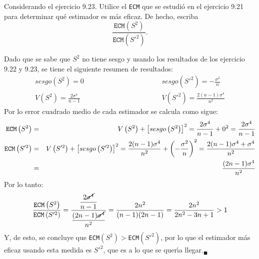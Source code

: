 \begin{enunciado}
 Considerando el ejercicio 9.23. Utilice el \texttt{ECM} que se estudi\'o en el ejercicio 9.21 para determinar qu\'e estimador es m\'as eficaz. De hecho, escriba
 \begin{equation*}
  \frac{\texttt{ECM}\left( S^2 \right)}{\texttt{ECM}\left( S'^2 \right)}.
 \end{equation*}
\end{enunciado}

\begin{solucion}
 Dado que se sabe que $S^2$ no tiene sesgo y usando los resultados de los ejercicio 9.22 y 9.23, se tiene el siguiente resumen de resultados:
 \begin{eqnarray*}
  sesgo\left( S^2 \right) = 0 & \hspace{4cm} & sesgo\left( S'^2 \right) = -\frac{\sigma^2}{n} \\
  V\left( S^2 \right) = \frac{2\sigma^4}{n-1} & & V\left( S'^2 \right) = \frac{2(n-1)\sigma^4}{n^2}
 \end{eqnarray*}
 Por lo error cuadrado medio de cada estimador se calcula como sigue:
 \begin{eqnarray*}
  \text{\texttt{ECM}}\left( S^2 \right) & = & V\left( S^2 \right) + \left[ sesgo\left( S^2 \right) \right]^2 = \frac{2\sigma^4}{n-1} + 0^2 = \frac{2\sigma^4}{n-1} \\
  \text{\texttt{ECM}}\left( S'^2 \right) & = & V\left( S'^2 \right) + \left[ sesgo\left( S'^2 \right) \right]^2 = \frac{2(n-1)\sigma^4}{n^2} + \left( -\frac{\sigma^2}{n} \right)^2 = \frac{2(n-1)\sigma^4 + \sigma^4}{n^2} \\
  & = & \frac{(2n-1)\sigma^4}{n^2}
 \end{eqnarray*}
 Por lo tanto:
 \begin{equation*}
  \frac{\texttt{ECM}\left( S^2 \right)}{\texttt{ECM}\left( S'^2 \right)} = \frac{\displaystyle{\frac{2\cancel{\sigma^4}}{n-1}}}{\displaystyle{\frac{(2n-1)\cancel{\sigma^4}}{n^2}}} = \frac{2n^2}{(n-1)(2n-1)} = \frac{2n^2}{2n^2 - 3n + 1} > 1
 \end{equation*}
 Y, de esto, se concluye que \texttt{ECM}$\left( S^2 \right) > $\texttt{ECM}$\left( S'^2 \right)$, por lo que el estimador m\'as eficaz usando esta medida es $S'^2$, que es a lo que se quer\'{\i}a llegar.${}_{\blacksquare}$
\end{solucion}
